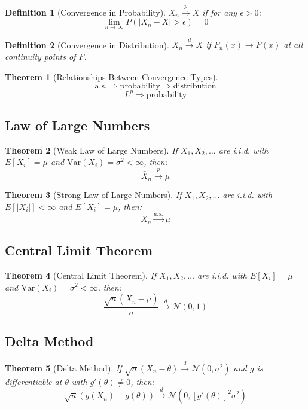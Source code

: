 \documentclass[12pt,a4paper]{amsart}
\newtheorem{theorem}{Theorem}[section]
\newtheorem{definition}{Definition}[section]
\theoremstyle{remark}
\begin{document}
\begin{definition}[Convergence in Probability]
$X_n \stackrel{p}{\to} X$ if for any $\epsilon > 0$:
$$\lim_{n \to \infty} P(|X_n - X| > \epsilon) = 0$$
\end{definition}

\begin{definition}[Convergence in Distribution]
$X_n \stackrel{d}{\to} X$ if $F_n(x) \to F(x)$ at all continuity points of $F$.
\end{definition}

\begin{theorem}[Relationships Between Convergence Types]
$$\text{a.s.} \Rightarrow \text{probability} \Rightarrow \text{distribution}$$
$$L^p \Rightarrow \text{probability}$$
\end{theorem}

\subsection{Law of Large Numbers}

\begin{theorem}[Weak Law of Large Numbers]
If $X_1, X_2, \ldots$ are i.i.d. with $E[X_i] = \mu$ and $\text{Var}(X_i) = \sigma^2 < \infty$, then:
$$\bar{X}_n \stackrel{p}{\to} \mu$$
\end{theorem}

\begin{theorem}[Strong Law of Large Numbers]
If $X_1, X_2, \ldots$ are i.i.d. with $E[|X_i|] < \infty$ and $E[X_i] = \mu$, then:
$$\bar{X}_n \stackrel{a.s.}{\to} \mu$$
\end{theorem}

\subsection{Central Limit Theorem}

\begin{theorem}[Central Limit Theorem]
If $X_1, X_2, \ldots$ are i.i.d. with $E[X_i] = \mu$ and $\text{Var}(X_i) = \sigma^2 < \infty$, then:
$$\frac{\sqrt{n}(\bar{X}_n - \mu)}{\sigma} \stackrel{d}{\to} \mathcal{N}(0,1)$$
\end{theorem}

\subsection{Delta Method}

\begin{theorem}[Delta Method]
If $\sqrt{n}(X_n - \theta) \stackrel{d}{\to} \mathcal{N}(0, \sigma^2)$ and $g$ is differentiable at $\theta$ with $g'(\theta) \neq 0$, then:
$$\sqrt{n}(g(X_n) - g(\theta)) \stackrel{d}{\to} \mathcal{N}(0, [g'(\theta)]^2 \sigma^2)$$
\end{theorem}
\end{document}
